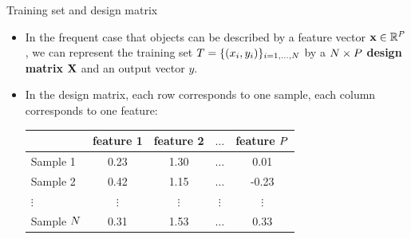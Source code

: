 \documentclass[xcolor=pdftex,dvipsnames,table]{beamer}
\begin{document}
\begin{frame}{Training set and design matrix}
\begin{itemize}
\item In the frequent case that objects can be described by a feature vector $\mathbf{x} \in \mathbb{R}^{P}$, we can represent the training set $T = \{(x_i, y_i)\}_{i=1, \ldots, N}$ by a $N \times P$ \textbf{design matrix} $\mathbf{X}$ and an output vector $y$.
\item In the design matrix, each row corresponds to one sample, each column corresponds to one feature:
\begin{table}
\begin{tabular}{|l || c | c | c | c |}
	\hline
		& feature 1 & feature 2 & $\ldots$ & feature $P$ \\
	\hline \hline
	Sample 1 & 0.23 & 1.30 & $\ldots$ & 0.01 \\
	\hline
	Sample 2 & 0.42 & 1.15 & $\ldots$ & -0.23 \\
	\hline
	$\vdots$ & $\vdots$ & $\vdots$ & $\vdots$ & $\vdots$ \\
	\hline
	Sample $N$ & 0.31 & 1.53 & $\ldots$ & 0.33 \\
	\hline
\end{tabular}
\end{table}
\end{itemize}
\end{frame}
\end{document}
